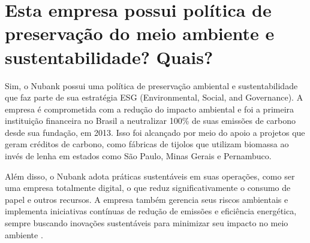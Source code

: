 \section{Esta empresa possui política de preservação do meio ambiente e sustentabilidade? Quais?}

Sim, o Nubank possui uma política de preservação ambiental e sustentabilidade que faz parte de sua estratégia ESG (Environmental, Social, and Governance). A empresa é comprometida com a redução do impacto ambiental e foi a primeira instituição financeira no Brasil a neutralizar 100\% de suas emissões de carbono desde sua fundação, em 2013. Isso foi alcançado por meio do apoio a projetos que geram créditos de carbono, como fábricas de tijolos que utilizam biomassa ao invés de lenha em estados como São Paulo, Minas Gerais e Pernambuco.

Além disso, o Nubank adota práticas sustentáveis em suas operações, como ser uma empresa totalmente digital, o que reduz significativamente o consumo de papel e outros recursos. A empresa também gerencia seus riscos ambientais e implementa iniciativas contínuas de redução de emissões e eficiência energética, sempre buscando inovações sustentáveis para minimizar seu impacto no meio ambiente \cite{nubankesg2024}.
